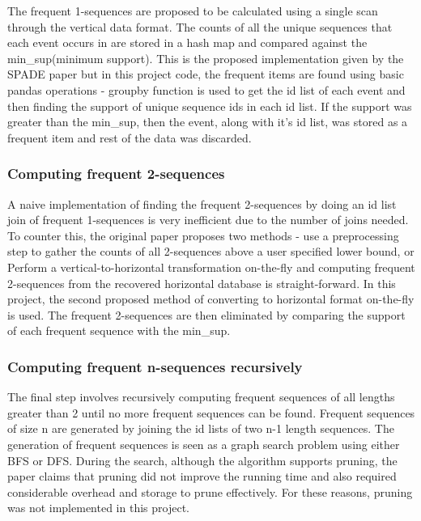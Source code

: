 The frequent 1-sequences are proposed to be calculated using a single scan through the vertical data format. The counts of all the unique sequences that each event occurs in are stored in a hash map and compared against the min\_sup(minimum support). This is the proposed implementation given by the SPADE paper \cite{b1} but in this project code, the frequent items are found using basic pandas operations - groupby function is used to get the id list of each event and then finding the support of unique sequence ids in each id list. If the support was greater than the min\_sup, then the event, along with it's id list, was stored as a frequent item and rest of the data was discarded.

\subsubsection{Computing frequent 2-sequences}

A naive implementation of finding the frequent 2-sequences by doing an id list join of frequent 1-sequences is very inefficient due to the number of joins needed. To counter this, the original paper proposes two methods - use a preprocessing step to gather the counts of all 2-sequences above a user specified lower bound, or  Perform a vertical-to-horizontal transformation on-the-fly and computing frequent 2-sequences from the recovered horizontal database is straight-forward. In this project, the second proposed method of converting to horizontal format on-the-fly is used. The frequent 2-sequences are then eliminated by comparing the support of each frequent sequence with the min\_sup.

\subsubsection{Computing frequent n-sequences recursively}

The final step involves recursively computing frequent sequences of all lengths greater than 2 until no more frequent sequences can be found. Frequent sequences of size n are generated by joining the id lists of two n-1 length sequences. The generation of frequent sequences is seen as a graph search problem using either BFS or DFS. During the search, although the algorithm supports pruning, the paper claims that pruning did not improve the running time and also required considerable overhead and storage to prune effectively. For these reasons, pruning was not implemented in this project.


